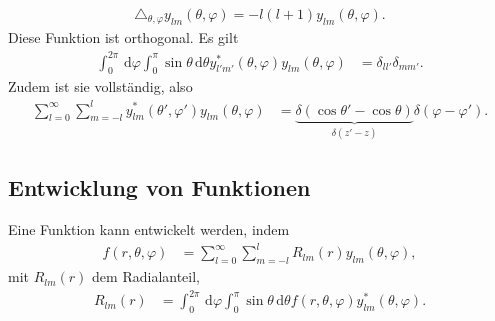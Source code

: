 \documentclass[a4paper,12pt]{article}
\newcommand{\td}{\,\text{d}}
\numberwithin{equation}{section}
\begin{document}
\begin{align} 
        \triangle_{\theta ,\varphi }y_{l m}\left(\theta ,\varphi \right)=-l\left(l+1\right)y_{l m}\left(\theta ,\varphi \right)
.\end{align} 
Diese Funktion ist orthogonal. Es gilt
\begin{align} 
        \int_{0}^{2\pi }\td \varphi \int_{0}^{\pi }\sin \theta \td \theta y_{l'm'}^*\left(\theta ,\varphi \right)y_{l m}\left(\theta ,\varphi \right)&=\delta _{ll'}\delta _{mm'}
.\end{align} 
Zudem ist sie vollständig, also
\begin{align} 
        \sum_{l=0}^{\infty}\sum_{m=-l}^{l}y_{l m}^*\left(\theta ',\varphi '\right)y_{l m}\left(\theta ,\varphi \right)&=\underbrace{\delta \left(\cos \theta '-\cos \theta \right)}_{\delta \left(z'-z\right)}\delta \left(\varphi -\varphi '\right)
.\end{align} 

\subsection{Entwicklung von Funktionen}
Eine Funktion kann entwickelt werden, indem
\begin{align} 
        f\left(r,\theta ,\varphi \right)&=\sum_{l=0}^{\infty}\sum_{m=-l}^{l}R_{l m}\left(r\right)y_{l m}\left(\theta ,\varphi \right)
,\end{align} 
mit $R_{l m}\left(r\right)$ dem Radialanteil,
\begin{align} 
        R_{l m}\left(r\right)&=\int_{0}^{2\pi }\td \varphi \int_{0}^{\pi }\sin \theta \td \theta f\left(r,\theta ,\varphi \right)y_{l m}^*\left(\theta ,\varphi \right)
.\end{align} 
\end{document}
